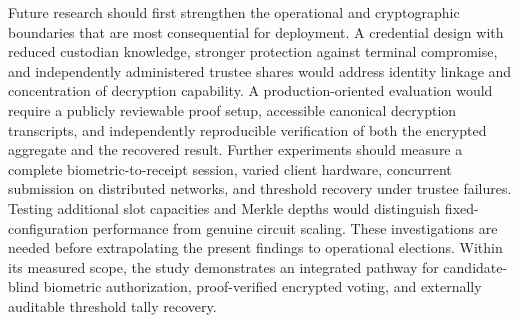 Future research should first strengthen the operational and cryptographic
boundaries that are most consequential for deployment. A credential design
with reduced custodian knowledge, stronger protection against terminal
compromise, and independently administered trustee shares would address
identity linkage and concentration of decryption capability. A
production-oriented evaluation would require a publicly reviewable proof
setup, accessible canonical decryption transcripts, and independently
reproducible verification of both the encrypted aggregate and the recovered
result. Further experiments should measure a complete biometric-to-receipt
session, varied client hardware, concurrent submission on distributed
networks, and threshold recovery under trustee failures. Testing additional
slot capacities and Merkle depths would distinguish fixed-configuration
performance from genuine circuit scaling. These investigations are needed
before extrapolating the present findings to operational elections. Within
its measured scope, the study demonstrates an integrated pathway for
candidate-blind biometric authorization, proof-verified encrypted voting,
and externally auditable threshold tally recovery.
